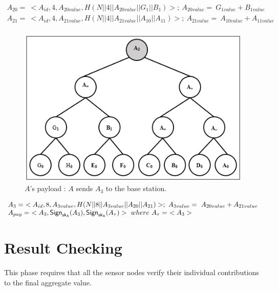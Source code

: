 \documentclass[%
  slidesonly,%
  semlayer%
  ]{seminar}                                  %
\newcommand{\sk}{\sf{sk}}
\begin{document}
\begin{slide}
      \begin{equation*}
        \begin{array}{l}
          A_{20} =\ <A_{id},4,A_{20value},H(N||4||A_{20value}||G_{1}||B_{1})>;\ A_{20value} =\ G_{1value} + B_{1value}\\ 
          A_{21} =\ <A_{id},4,A_{21value},H(N||4||A_{21value}||A_{10}||A_{11})>;\ A_{21value} =\ A_{10value} + A_{11value}\\ 
        \end{array}
      \end{equation*}

      \begin{figure}[h!]
        \centering
        \includegraphics[scale = 0.5]{images/a-payload.png}
        \caption{$A$'s payload : $A$ sends $A_{3}$ to the base station.}
        \label{fig:a-payload}
      \end{figure}

      \begin{equation*}
        \begin{array}{l}
        A_{3} =\ <A_{id}, 8, A_{3value}, H(N||8||A_{3value}||A_{20}||A_{21})>;\ A_{3value} =\ A_{20value} + A_{21value}\\
        A_{pay} =\ <A_{3},\textsf{Sign}_{\sk_{A}}(A_{3}),\textsf{Sign}_{\sk_{A}}(A_{\tau})>\ where\ A_{\tau} =\ <A_{3}>
        \end{array}
      \end{equation*}
     \vfill
     \clearpage

  \section*{Result Checking}
    This phase requires that all the sensor nodes verify their individual contributions to the final aggregate value.


\end{slide}
\end{document}
